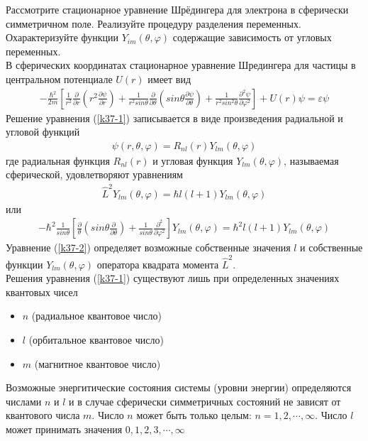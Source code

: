 \documentclass[__main__.tex]{subfiles}
\begin{document}
Рассмотрите стационарное уравнение Шрёдингера для электрона в сферически симметричном поле. Реализуйте процедуру разделения переменных. Охарактеризуйте функции $Y_{im}(\theta,\varphi)$ содержащие зависимость от угловых переменных.\\

В сферических координатах стационарное уравнение Шредингера для частицы в центральном потенциале $U(r)$ имеет вид
\begin{gather}
    \label{k37-1}
    -\frac{\hbar^2}{2m}\left[\frac{1}{r^2}\frac{\partial}{\partial r}\left(r^2\frac{\partial \psi}{\partial r}\right)+\frac{1}{r^2sin\theta}\frac{\partial}{\partial\theta}\left(sin\theta\frac{\partial \psi}{\partial \theta}\right)+\frac{1}{r^2sin^2\theta}\frac{\partial^2\psi}{\partial \varphi^2}\right]+U(r)\psi = \varepsilon\psi
\end{gather}
Решение уравнения (\ref{k37-1}) записывается в виде произведения радиальной и угловой функций
\begin{gather*}
    \psi(r,\theta,\varphi) = R_{nl}(r)Y_{lm}(\theta,\varphi)
\end{gather*}
где радиальная функция $R_{nl}(r)$ и угловая функция $Y_{lm}(\theta,\varphi)$, называемая сферической, удовлетворяют уравнениям
\begin{gather}
    \label{k37-2}
    \hat{L}^2Y_{lm}(\theta,\varphi) = \hbar l(l+1)Y_{lm}(\theta,\varphi)
\end{gather}
или
\begin{gather*}
    -\hbar^2\frac{1}{sin\theta}\left[\frac{\partial}{\theta}\left(sin\theta\frac{\partial}{\partial\theta}\right)+\frac{1}{sin\theta}\frac{\partial^2}{\partial\varphi^2}\right]Y_{lm}(\theta,\varphi) = \hbar^2 l(l+1)Y_{lm}(\theta,\varphi)
\end{gather*}
Уравнение (\ref{k37-2}) определяет возможные собственные значения $l$ и собственные функции $Y_{lm}(\theta,\varphi)$ оператора квадрата момента $\hat{L}^2$.\\
Решения уравнения (\ref{k37-1}) существуют лишь при определенных значениях квантовых чисел
\begin{itemize}
    \item $n$ (радиальное квантовое число)
    \item $l$ (орбитальное квантовое число)
    \item $m$ (магнитное квантовое число)
\end{itemize}
Возможные энергитические состояния системы (уровни энергии) определяются числами $n$ и $l$ и в случае сферически симметричных состояний не зависят от квантового числа $m$. Число $n$ может быть только целым: $n = 1,2,\cdots, \infty$. Число $l$ может принимать значения $0,1,2,3,\cdots, \infty$
\end{document}
